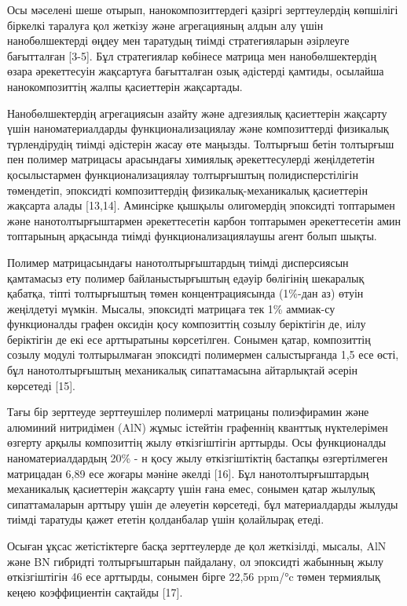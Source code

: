Осы мәселені шеше отырып, нанокомпозиттердегі қазіргі зерттеулердің
көпшілігі біркелкі таралуға қол жеткізу және агрегацияның алдын алу үшін
нанобөлшектерді өңдеу мен таратудың тиімді стратегияларын әзірлеуге
бағытталған {[}3-5{]}. Бұл стратегиялар көбінесе матрица мен
нанобөлшектердің өзара әрекеттесуін жақсартуға бағытталған озық
әдістерді қамтиды, осылайша нанокомпозиттің жалпы қасиеттерін
жақсартады.

Нанобөлшектердің агрегациясын азайту және адгезиялық қасиеттерін
жақсарту үшін наноматериалдарды функционализациялау және композиттерді
физикалық түрлендірудің тиімді әдістерін жасау өте маңызды. Толтырғыш
бетін толтырғыш пен полимер матрицасы арасындағы химиялық
әрекеттесулерді жеңілдететін қосылыстармен функционализациялау
толтырғыштың полидисперстілігін төмендетіп, эпоксидті композиттердің
физикалық-механикалық қасиеттерін жақсарта алады {[}13,14{]}. Аминсірке
қышқылы олигомердің эпоксидті топтарымен және нанотолтырғыштармен
әрекеттесетін карбон топтарымен әрекеттесетін амин топтарының арқасында
тиімді функционализациялаушы агент болып шықты.

Полимер матрицасындағы нанотолтырғыштардың тиімді дисперсиясын
қамтамасыз ету полимер байланыстырғыштың едәуір бөлігінің шекаралық
қабатқа, тіпті толтырғыштың төмен концентрациясында (1\%-дан аз) өтуін
жеңілдетуі мүмкін. Мысалы, эпоксидті матрицаға тек 1\% аммиак-су
функционалды графен оксидін қосу композиттің созылу беріктігін де, иілу
беріктігін де екі есе арттыратыны көрсетілген. Сонымен қатар,
композиттің созылу модулі толтырылмаған эпоксидті полимермен
салыстырғанда 1,5 есе өсті, бұл нанотолтырғыштың механикалық
сипаттамасына айтарлықтай әсерін көрсетеді {[}15{]}.

Тағы бір зерттеуде зерттеушілер полимерлі матрицаны полиэфирамин және
алюминий нитридімен (AlN) жұмыс істейтін графеннің кванттық нүктелерімен
өзгерту арқылы композиттің жылу өткізгіштігін арттырды. Осы функционалды
наноматериалдардың 20\% - н қосу жылу өткізгіштіктің бастапқы
өзгертілмеген матрицадан 6,89 есе жоғары мәніне әкелді {[}16{]}. Бұл
нанотолтырғыштардың механикалық қасиеттерін жақсарту үшін ғана емес,
сонымен қатар жылулық сипаттамаларын арттыру үшін де әлеуетін көрсетеді,
бұл материалдарды жылуды тиімді таратуды қажет ететін қолданбалар үшін
қолайлырақ етеді.

Осыған ұқсас жетістіктерге басқа зерттеулерде де қол жеткізілді, мысалы,
AlN және BN гибридті толтырғыштарын пайдалану, ол эпоксидті жабынның
жылу өткізгіштігін 46 есе арттырды, сонымен бірге 22,56 ppm/°c төмен
термиялық кеңею коэффициентін сақтайды {[}17{]}.


